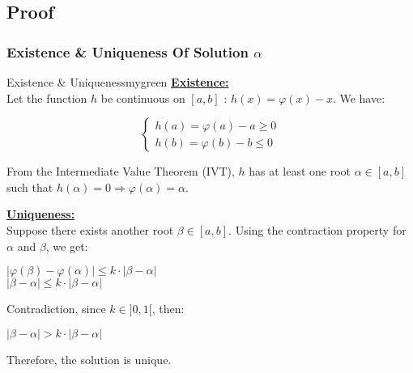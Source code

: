 \subsection{Proof}
\subsubsection{Existence \& Uniqueness Of Solution \(\alpha\)}
\begin{prettyBox}{Existence \& Uniqueness}{mygreen}
\textbf{\underline{Existence:}}\\[0.2cm]
Let the function \(h\) be continuous on \([a,b]\) : \(h(x) = \varphi(x) - x\).
We have:

\vspace{-0.6cm}
\begin{center}
\[
\left\{
\begin{array}{ll}
   h(a) = \varphi(a) - a \geq 0 \\[0.1cm]
   h(b) = \varphi(b) - b \leq 0
\end{array}
\right.
\]
\end{center}

From the Intermediate Value Theorem (IVT), \(h\) has at least one root \(\alpha \in [a,b]\) such that  
\(h(\alpha) = 0 \Longrightarrow \varphi(\alpha) = \alpha\).

\vspace{0.4cm}

\textbf{\underline{Uniqueness:}}\\[0.2cm]
Suppose there exists another root \(\beta \in [a,b]\). Using the contraction property for
\(\alpha\) and \(\beta\), we get:
\vspace{0.1cm}
\begin{center}
    \(|\varphi(\beta) - \varphi(\alpha)| \leq k\cdot|\beta-\alpha|\)\\[0.2cm]
    \(|\beta - \alpha| \leq k\cdot|\beta-\alpha|\)
\end{center}
Contradiction, since \(k \in ]0,1[\), then:
\begin{center}
      \(|\beta - \alpha| > k\cdot|\beta-\alpha|\)\\[0.1cm]
\end{center}
Therefore, the solution is unique.
\end{prettyBox}

\vspace{0.5cm}


